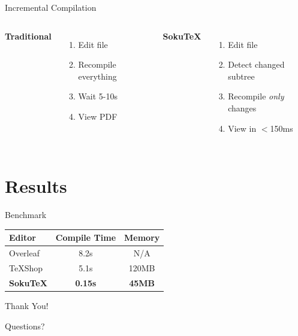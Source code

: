 \documentclass{beamer}
\begin{document}
\begin{frame}{Incremental Compilation}
\begin{columns}
    \textbf{Traditional}
    \begin{enumerate}
        \item Edit file
        \item Recompile everything
        \item Wait 5-10s
        \item View PDF
    \end{enumerate}

    \textbf{SokuTeX}
    \begin{enumerate}
        \item Edit file
        \item Detect changed subtree
        \item Recompile \textit{only} changes
        \item View in $<$150ms
    \end{enumerate}
\end{columns}
\end{frame}

\section{Results}

\begin{frame}{Benchmark}
\begin{table}
\centering
\begin{tabular}{lcc}
\hline
\textbf{Editor} & \textbf{Compile Time} & \textbf{Memory} \\
\hline
Overleaf   & 8.2s  & N/A \\
TeXShop    & 5.1s  & 120MB \\
\textbf{SokuTeX} & \textbf{0.15s} & \textbf{45MB} \\
\hline
\end{tabular}
\end{table}
\end{frame}

\begin{frame}
\centering
\Huge Thank You!

\vspace{1cm}
\normalsize
Questions?
\end{frame}
\end{document}
